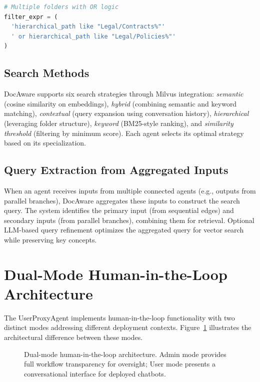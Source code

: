 \documentclass[11pt]{article}
\begin{document}
\begin{lstlisting}[language=Python,caption={Content filter expression building}]
# Multiple folders with OR logic
filter_expr = (
  'hierarchical_path like "Legal/Contracts%"'
  ' or hierarchical_path like "Legal/Policies%"'
)
\end{lstlisting}

\subsection{Search Methods}

DocAware supports six search strategies through Milvus integration: \textit{semantic} (cosine similarity on embeddings), \textit{hybrid} (combining semantic and keyword matching), \textit{contextual} (query expansion using conversation history), \textit{hierarchical} (leveraging folder structure), \textit{keyword} (BM25-style ranking), and \textit{similarity threshold} (filtering by minimum score). Each agent selects its optimal strategy based on its specialization.

\subsection{Query Extraction from Aggregated Inputs}

When an agent receives inputs from multiple connected agents (e.g., outputs from parallel branches), DocAware aggregates these inputs to construct the search query. The system identifies the primary input (from sequential edges) and secondary inputs (from parallel branches), combining them for retrieval. Optional LLM-based query refinement optimizes the aggregated query for vector search while preserving key concepts.


\section{Dual-Mode Human-in-the-Loop Architecture}
\label{sec:hitl}

The UserProxyAgent implements human-in-the-loop functionality with two distinct modes addressing different deployment contexts. Figure~\ref{fig:hitl-modes} illustrates the architectural difference between these modes.

\begin{figure}[t]
    \centering
    \caption{Dual-mode human-in-the-loop architecture. Admin mode provides full workflow transparency for oversight; User mode presents a conversational interface for deployed chatbots.}
    \label{fig:hitl-modes}
\end{figure}
\end{document}
